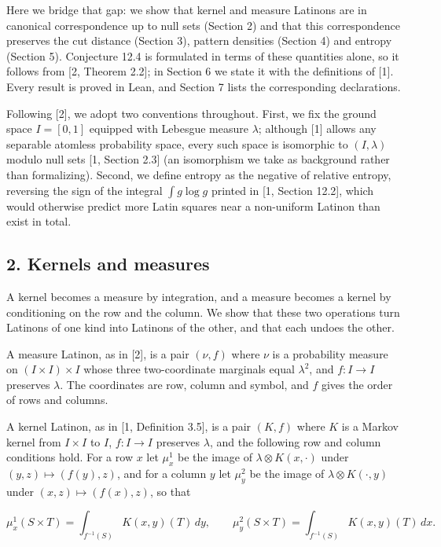 \documentclass[english,11pt,a4paper]{article}
\begin{document}
Here we bridge that gap: we show that kernel and measure Latinons are in canonical correspondence up to null sets (Section 2) and that this correspondence preserves the cut distance (Section 3), pattern densities (Section 4) and entropy (Section 5). Conjecture 12.4 is formulated in terms of these quantities alone, so it follows from {[}2, Theorem 2.2{]}; in Section 6 we state it with the definitions of {[}1{]}. Every result is proved in Lean, and Section 7 lists the corresponding declarations.

Following {[}2{]}, we adopt two conventions throughout. First, we fix the ground space \(I=[0,1]\) equipped with Lebesgue measure \(\lambda\); although {[}1{]} allows any separable atomless probability space, every such space is isomorphic to \((I,\lambda)\) modulo null sets {[}1, Section 2.3{]} (an isomorphism we take as background rather than formalizing). Second, we define entropy as the negative of relative entropy, reversing the sign of the integral \(\int g\log g\) printed in {[}1, Section 12.2{]}, which would otherwise predict more Latin squares near a non-uniform Latinon than exist in total.

\subsection{2. Kernels and measures}\label{kernels-and-measures}

A kernel becomes a measure by integration, and a measure becomes a kernel by conditioning on the row and the column. We show that these two operations turn Latinons of one kind into Latinons of the other, and that each undoes the other.

A measure Latinon, as in {[}2{]}, is a pair \((\nu,f)\) where \(\nu\) is a probability measure on \((I\times I)\times I\) whose three two-coordinate marginals equal \(\lambda^2\), and \(f:I\to I\) preserves \(\lambda\). The coordinates are row, column and symbol, and \(f\) gives the order of rows and columns.

A kernel Latinon, as in {[}1, Definition 3.5{]}, is a pair \((K,f)\) where \(K\) is a Markov kernel from \(I\times I\) to \(I\), \(f:I\to I\) preserves \(\lambda\), and the following row and column conditions hold. For a row \(x\) let \(\mu^1_x\) be the image of \(\lambda\otimes K(x,\cdot)\) under \((y,z)\mapsto(f(y),z)\), and for a column \(y\) let \(\mu^2_y\) be the image of \(\lambda\otimes K(\cdot,y)\) under \((x,z)\mapsto(f(x),z)\), so that

\nopagebreak[4]
\[\mu^1_x(S\times T)=\int_{f^{-1}(S)}K(x,y)(T)\,dy,\qquad
\mu^2_y(S\times T)=\int_{f^{-1}(S)}K(x,y)(T)\,dx.\tag{2.1}\]
\end{document}
